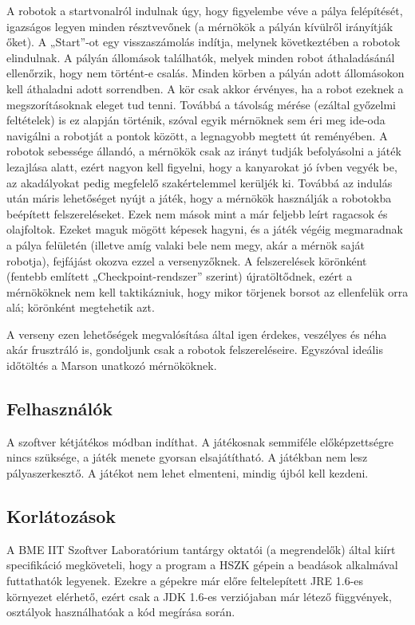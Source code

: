 A robotok a startvonalról indulnak úgy, hogy figyelembe véve a pálya felépítését, igazságos legyen minden résztvevőnek (a mérnökök a pályán kívülről irányítják őket). A „Start”-ot egy visszaszámolás indítja, melynek következtében a robotok elindulnak. A pályán állomások találhatók, melyek minden robot áthaladásánál ellenőrzik, hogy nem történt-e csalás. Minden körben a pályán adott állomásokon kell áthaladni adott sorrendben. A kör csak akkor érvényes, ha a robot ezeknek a megszorításoknak eleget tud tenni. Továbbá a távolság mérése (ezáltal győzelmi feltételek) is ez alapján történik, szóval egyik mérnöknek sem éri meg ide-oda navigálni a robotját a pontok között, a legnagyobb megtett út reményében.
A robotok sebessége állandó, a mérnökök csak az irányt tudják befolyásolni a játék lezajlása alatt, ezért nagyon kell figyelni, hogy a kanyarokat jó ívben vegyék be, az akadályokat pedig megfelelő szakértelemmel kerüljék ki. Továbbá az indulás után máris lehetőséget nyújt a játék, hogy a mérnökök használják a robotokba beépített felszereléseket. Ezek nem mások mint a már feljebb leírt ragacsok és olajfoltok. Ezeket maguk mögött képesek hagyni, és a játék végéig megmaradnak a pálya felületén (illetve amíg valaki bele nem megy, akár a mérnök saját robotja), fejfájást okozva ezzel a versenyzőknek. A felszerelések körönként (fentebb említett „Checkpoint-rendszer” szerint) újratöltődnek, ezért a mérnököknek nem kell taktikázniuk, hogy mikor törjenek borsot az ellenfelük orra alá; körönként megtehetik azt.

A verseny ezen lehetőségek megvalósítása által igen érdekes, veszélyes és néha akár frusztráló is, gondoljunk csak a robotok felszereléseire. Egyszóval ideális időtöltés a Marson unatkozó mérnököknek.

\subsection{Felhasználók}
A szoftver kétjátékos módban indíthat. A játékosnak semmiféle előképzettségre nincs szüksége, a játék menete gyorsan elsajátítható. A játékban nem lesz pályaszerkesztő. A játékot nem lehet elmenteni, mindig újból kell kezdeni.

\subsection{Korlátozások}
A BME IIT Szoftver Laboratórium tantárgy oktatói (a megrendelők) által kiírt specifikáció megköveteli, hogy a program a HSZK gépein a beadások alkalmával futtathatók legyenek. Ezekre a gépekre már előre feltelepített JRE 1.6-es környezet elérhető, ezért csak a JDK 1.6-es verziójaban már létező függvények, osztályok használhatóak a kód megírása során.


